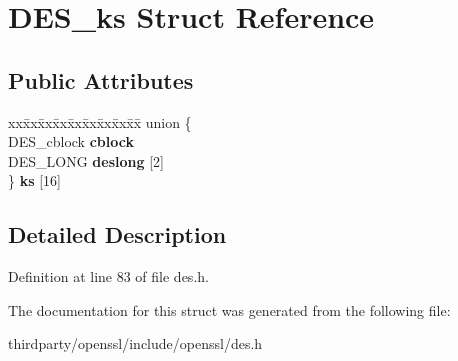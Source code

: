 \hypertarget{struct_d_e_s__ks}{}\section{D\+E\+S\+\_\+ks Struct Reference}
\label{struct_d_e_s__ks}
\subsection*{Public Attributes}
\begin{DoxyCompactItemize}
\item 
\mbox{\label{struct_d_e_s__ks_af2949676075ca364f24f8e7857f9cdd3}} 
\begin{tabbing}
xx\=xx\=xx\=xx\=xx\=xx\=xx\=xx\=xx\=\kill
union \{\\
\>DES\_cblock {\bfseries cblock}\\
\>DES\_LONG {\bfseries deslong} \mbox{[}2\mbox{]}\\
\} {\bfseries ks} \mbox{[}16\mbox{]}\\

\end{tabbing}\end{DoxyCompactItemize}


\subsection{Detailed Description}


Definition at line 83 of file des.\+h.



The documentation for this struct was generated from the following file\+:\begin{DoxyCompactItemize}
\item 
thirdparty/openssl/include/openssl/des.\+h\end{DoxyCompactItemize}
